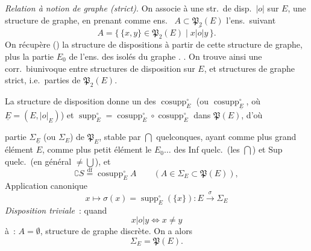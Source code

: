 \documentclass[11pt,a4paper]{article}
\begin{document}
\emph{Relation à notion de graphe (strict)}. On associe à une str.\ de disp.\ $\mathrel{|o|}$ sur $E$, une structure de graphe, en prenant comme ens.\  $A \subset \mathfrak{P}_2(E)$ l'ens.\ suivant
\[ A = \bigl\{\, \{x, y\} \in \mathfrak{P}_2(E) \mid x \mathrel{\overline{|o|}} y \,\bigr\}. \]
On récupère () la structure de dispositions à partir de cette structure de graphe,   \struck{\ill{}}  plus  la partie $E_0$ de l'ens.  des   isolés du graphe .
  .
On trouve ainsi une corr.\ biunivoque entre structures de disposition  sur $E$, et structures de graphe strict, i.e.\ parties de $\mathfrak{P}_2(E)$.

La structure de disposition donne un  des  $\operatorname{cosupp}^{\circ}_{E}$ (ou $\operatorname{cosupp}^{\circ}_{\underline{E}}$, où $\underline{E} = (E, |o|_E)$) et $\operatorname{supp}^{\circ}_{E} = \operatorname{cosupp}^{\circ}_{E} \circ \operatorname{cosupp}^{\circ}_{E}$ dans $\mathfrak{P}(E)$, d'où

partie $\Sigma_{\underline{E}}$ (ou $\Sigma_E$) de $\mathfrak{P}_E$, stable par $\bigcap$ quelconques, ayant comme plus grand élément $E$, comme plus petit élément le  $E_0 \ldots$  des Inf quelc.\ (les $\bigcap$) et Sup quelc.\ (en général $\neq \bigcup$), et 
\[ \complement S \overset{\mathrm{df}}{=} \operatorname{cosupp}^{\circ}_{E} A \qquad (A \in \Sigma_E \subset \mathfrak{P}(E)), \]
Application canonique
\[ x \longmapsto \sigma(x) = \operatorname{supp}^{\circ}_{E}(\{x\}) : E \xrightarrow{\ \sigma\ } \Sigma_E \]
\emph{Disposition triviale}~: quand
\[ x \mathrel{|o|} y \Longleftrightarrow x \neq y \]
 à~: $A = \emptyset$, structure de graphe discrète. On a alors
\[ \Sigma_E = \mathfrak{P}(E). \]
\end{document}

